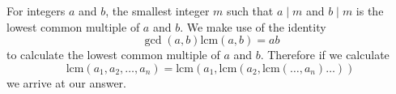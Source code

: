 For integers $a$ and $b$, the smallest
integer $m$ such that $a\mid m$ and
$b\mid m$ is the lowest common
multiple of $a$ and $b$. We make use
of the identity
$$\gcd(a,b)\text{lcm}(a,b)=ab$$
to calculate the lowest common
multiple of $a$ and $b$.
Therefore if we calculate
$$\text{lcm}(a_1, a_2, \dots,a_n)
=\text{lcm}(a_1, \text{lcm}(a_2,
\text{lcm}(\dots, a_n)\dots))$$
we arrive at our answer.
